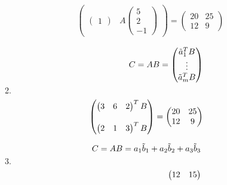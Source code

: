 \documentclass[12pt]{article}
\begin{document}
\begin{enumerate}
\begin{enumerate}
\begin{align*}
\begin{pmatrix}
\begin{pmatrix}
                    1
                \end{pmatrix}
                & A
                \begin{pmatrix}
                    5 \\
                    2 \\
                    -1
                \end{pmatrix}
            \end{pmatrix}
            = \begin{pmatrix}
                20 & 25 \\
                12 & 9
            \end{pmatrix}
        \end{align*}
        \item 
        \begin{align*}
            C = AB = \begin{pmatrix}
                \Tilde{a}_1^T B \\
                \vdots \\
                \Tilde{a}_m^T B
            \end{pmatrix} && \\ && \\
            \begin{pmatrix}
                \begin{pmatrix}
                    3 & 6 & 2
                \end{pmatrix}^T
                B \\ \\
                \begin{pmatrix}
                    2 & 1 & 3
                \end{pmatrix}^T
                B
            \end{pmatrix}
            = \begin{pmatrix}
                20 & 25 \\
                12 & 9 
            \end{pmatrix}
        \end{align*}
        \item 
        \begin{align*}
            C = AB = a_1 \Tilde{b}_1
            + a_2 \Tilde{b}_2
            + a_3 \Tilde{b}_3 && \\ && \\
            \begin{pmatrix}
                12 & 15 \\

\end{pmatrix}
\end{align*}
\end{enumerate}
\end{enumerate}
\end{document}
